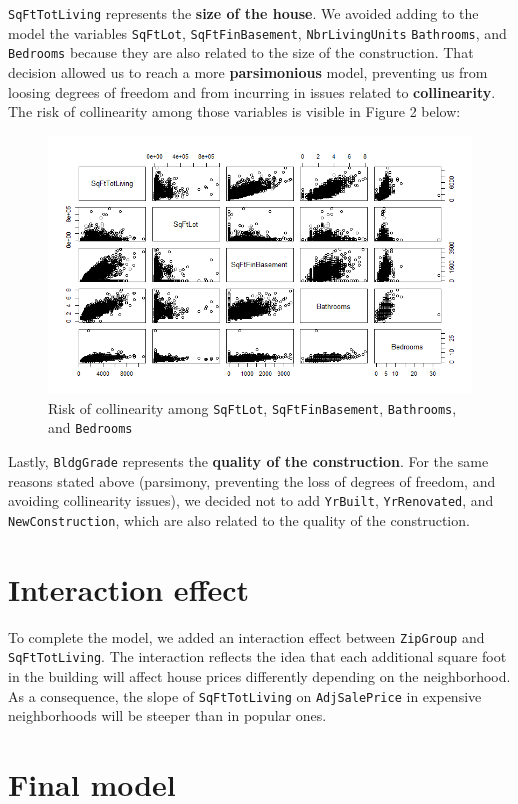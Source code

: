 \documentclass[12pt,a4paper]{article}
\begin{document}
	\noindent \texttt{SqFtTotLiving} represents the \textbf{size of the house}. We avoided adding to the model the variables \texttt{SqFtLot}, \texttt{SqFtFinBasement}, \texttt{NbrLivingUnits} \texttt{Bathrooms}, and \texttt{Bedrooms} because they are also related to the size of the construction. That decision allowed us to reach a more \textbf{parsimonious} model, preventing us from loosing degrees of freedom and from incurring in issues related to \textbf{collinearity}. The risk of collinearity among those variables is visible in Figure 2 below: \\
	
	\begin{figure}[H]
		\centering
		\includegraphics[width=1\linewidth]{SqFtTotLiving_pairs}
		\caption{Risk of collinearity among \texttt{SqFtLot}, \texttt{SqFtFinBasement}, \texttt{Bathrooms}, and \texttt{Bedrooms}}
		\label{fig:sqfttotlivingpairs}
	\end{figure}
		
	\noindent Lastly, \texttt{BldgGrade} represents the \textbf{quality of the construction}. For the same reasons stated above (parsimony, preventing the loss of degrees of freedom, and avoiding collinearity issues), we decided not to add \texttt{YrBuilt}, \texttt{YrRenovated}, and \texttt{NewConstruction}, which are also related to the quality of the construction. \\
	
\vspace{.5cm}

\section{Interaction effect}

	To complete the model, we added an interaction effect between \texttt{ZipGroup} and \texttt{SqFtTotLiving}. The interaction reflects the idea that each additional square foot in the building will affect house prices differently depending on the neighborhood. As a consequence, the slope of \texttt{SqFtTotLiving} on \texttt{AdjSalePrice} in expensive neighborhoods will be steeper than in popular ones.

\vspace{.5cm}

\section{Final model}
\end{document}
